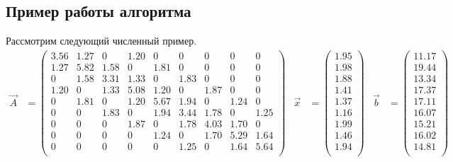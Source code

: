\newpage
\begin{landscape}
\subsection{Пример работы алгоритма}
Рассмотрим следующий численный пример.
\begin{align*}
    \vec{A} &=
    \begin{pmatrix}
        3.56 & 1.27 & 0 & 1.20 & 0 & 0 & 0 & 0 & 0 \\
        1.27 & 5.82 & 1.58 & 0 & 1.81 & 0 & 0 & 0 & 0 \\
        0 & 1.58 & 3.31 & 1.33 & 0 & 1.83 & 0 & 0 & 0 \\
        1.20 & 0 & 1.33 & 5.08 & 1.20 & 0 & 1.87 & 0 & 0 \\
        0 & 1.81 & 0 & 1.20 & 5.67 & 1.94 & 0 & 1.24 & 0 \\
        0 & 0 & 1.83 & 0 & 1.94 & 3.44 & 1.78 & 0 & 1.25 \\
        0 & 0 & 0 & 1.87 & 0 & 1.78 & 4.03 & 1.70 & 0 \\
        0 & 0 & 0 & 0 & 1.24 & 0 & 1.70 & 5.29 & 1.64 \\
        0 & 0 & 0 & 0 & 0 & 1.25 & 0 & 1.64 & 5.64 \\
    \end{pmatrix}
    &
    \vec{x} &= \begin{pmatrix}
        1.95 \\ 1.98 \\ 1.88 \\ 1.41 \\ 1.37 \\ 1.16 \\ 1.99 \\ 1.46 \\ 1.94 \\
    \end{pmatrix}
    &
    \vec{b} &= \begin{pmatrix}
        11.17 \\ 19.44 \\ 13.34 \\ 17.37 \\ 17.11 \\ 16.07 \\ 15.21 \\ 16.02 \\ 14.81 \\
    \end{pmatrix} \\
\end{align*}

\end{landscape}
